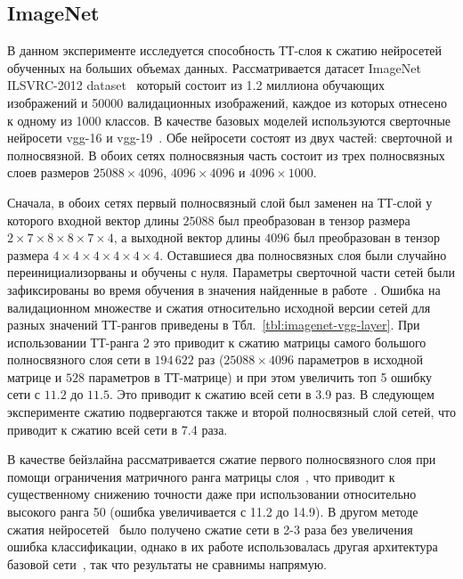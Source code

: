 \subsection{ImageNet}
В данном эксперименте исследуется способность ТТ-слоя к сжатию нейросетей обученных на больших объемах данных. Рассматривается датасет ImageNet ILSVRC-2012 dataset~\cite{Russakovsky2015ImageNet} который состоит из 1.2 миллиона обучающих изображений и 50000 валидационных изображений, каждое из которых отнесено к одному из 1000 классов. В качестве базовых моделей используются сверточные нейросети vgg-16 и vgg-19~\cite{simonyan15}. Обе нейросети состоят из двух частей: сверточной и полносвязной. В обоих сетях полносвязныя часть состоит из трех полносвязных слоев размеров $25088 \times 4096$, $4096 \times 4096$ и $4096 \times 1000$.

Сначала, в обоих сетях первый полносвязный слой был заменен на ТТ-слой у которого входной вектор длины $25088$ был преобразован в тензор размера $2 \times 7 \times 8 \times 8 \times 7 \times 4$, а выходной вектор длины $4096$ был преобразован в тензор размера $4 \times 4 \times 4 \times 4 \times 4 \times 4$. Оставшиеся два полносвязных слоя были случайно переинициализорваны и обучены с нуля. Параметры сверточной части сетей были зафиксированы во время обучения в значения найденные в работе~\cite{Russakovsky2015ImageNet}. Ошибка на валидационном множестве и сжатия относительно исходной версии сетей для разных значений ТТ-рангов приведены в Тбл.~\ref{tbl:imagenet-vgg-layer}. При использовании ТТ-ранга 2 это приводит к сжатию матрицы самого большого полносвязного слоя сети в $194\,622$ раз ($25088 \times 4096$ параметров в исходной матрице и $528$ параметров в ТТ-матрице) и при этом увеличить топ 5 ошибку сети с $11.2$ до $11.5$. Это приводит к сжатию всей сети в 3.9 раз. В следующем эксперименте сжатию подвергаются также и второй полносвязный слой сетей, что приводит к сжатию всей сети в 7.4 раза.

В качестве бейзлайна рассматривается сжатие первого полносвязного слоя при помощи ограничения матричного ранга матрицы слоя~\cite{Jimmy2014lowRankSNN}, что приводит к существенному снижению точности даже при использовании относительно высокого ранга 50 (ошибка увеличивается с 11.2 до 14.9). В другом методе сжатия нейросетей~\cite{yang2014deep} было получено сжатие сети в 2-3 раза без увеличения ошибка классификации, однако в их работе использовалась другая архитектура базовой сети~\cite{Krizhevsky2012AlexNet}, так что результаты не сравнимы напрямую.

